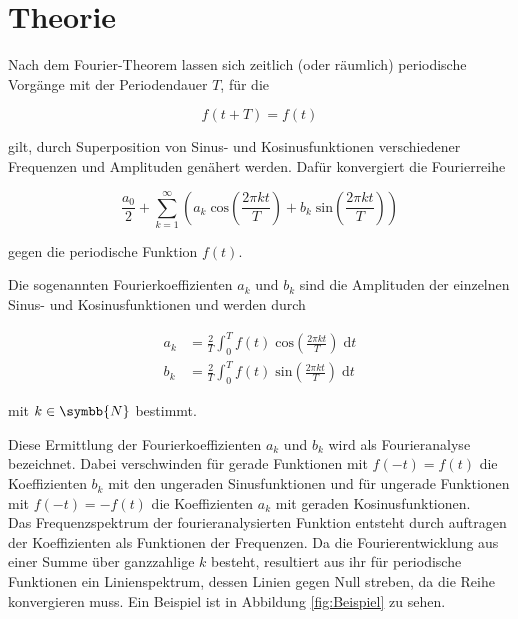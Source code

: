 \section{Theorie}
\label{sec:Theorie}

Nach dem Fourier-Theorem lassen sich zeitlich (oder räumlich) periodische Vorgänge mit der Periodendauer
$T$, für die

\begin{equation}
    f(t + T) = f(t) 
\end{equation}

gilt, durch Superposition von Sinus- und Kosinusfunktionen verschiedener Frequenzen und Amplituden genähert werden.
Dafür konvergiert die Fourierreihe

\begin{equation}
    \label{eqn:Entwicklung}
    \frac{a_0}{2} + \sum^\infty_{k = 1} \left(a_k \;  \text{cos}\left(\frac{2 \pi k t}{T} \right) + b_k \; \text{sin}
    \left(\frac{2 \pi k t}{T} \right) \right)
\end{equation}

gegen die periodische Funktion $f(t)$.   

Die sogenannten Fourierkoeffizienten $a_k$ und $b_k$ sind die Amplituden der einzelnen Sinus- und Kosinusfunktionen 
 und werden durch 

\begin{align}
    \label{eqn:Koeff}
    a_k &= \frac{2}{T} \int_0^T f(t) \; \text{cos}\left(\frac{2 \pi k t}{T} \right) \; \text{d}t \\
    b_k &= \frac{2}{T} \int_0^T f(t) \; \text{sin}\left(\frac{2 \pi k t}{T} \right) \; \text{d}t
\end{align}

mit $k \in \symbb{N}$ bestimmt. 

Diese Ermittlung der Fourierkoeffizienten $a_k$ und $b_k$ wird als Fourieranalyse bezeichnet.
Dabei verschwinden für gerade Funktionen mit $f(-t) = f(t)$ die Koeffizienten $b_k$ mit den ungeraden Sinusfunktionen und für
ungerade Funktionen mit $f(-t) = -f(t)$ die Koeffizienten $a_k$ mit geraden Kosinusfunktionen. \\

Das Frequenzspektrum der fourieranalysierten Funktion entsteht durch auftragen der Koeffizienten als Funktionen der Frequenzen.
Da die Fourierentwicklung aus einer Summe über ganzzahlige $k$ besteht, resultiert aus ihr für periodische Funktionen ein Linienspektrum, dessen
Linien gegen Null streben, da die Reihe konvergieren muss. Ein Beispiel ist in 
Abbildung \ref{fig:Beispiel} zu sehen.

